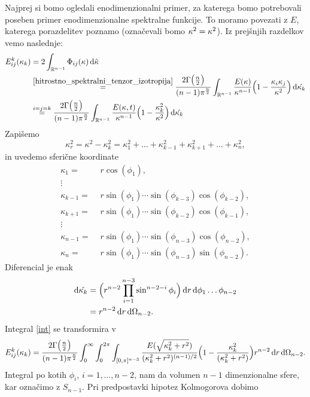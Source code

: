 \documentclass[mat2, tisk]{fmfdelo}
\newcommand{\R}{\mathbb R}
\newcommand{\bd}{\textbf}
\begin{document}
Najprej si bomo ogledali enodimenzionalni primer, za katerega bomo
potrebovali poseben primer enodimenzionalne spektralne funkcije. To moramo 
povezati z $E$, katerega porazdelitev poznamo (označevali bomo $\bd{\text{$\kappa$}}^2 = \kappa^2$). Iz prejšnjih razdelkov vemo 
naslednje: 
\begin{align}
E_{ij}^k(\kappa_k) &= 2 \int_{\R^{n-1}}\Phi_{ij}(\bd{\text{$\kappa$}}) \dif \hat{\bd{\text{$\kappa$}}} \nonumber\\
&\stackrel{\eqref{hitrostno_spektralni_tenzor_izotropija}}{=} \frac{2\Gamma\big(\frac{n}{2}\big)}{(n-1)\pi^\frac{n}{2}} \int_{\R^{n-1}} \frac{E(\kappa)}{\kappa^{n-1}}\Big(1 - \frac{\kappa_i \kappa_j}{\kappa^2}\Big)\dif \hat{\bd{\text{$\kappa_k$}}}\nonumber\\
&\stackrel{i=j=k}{=} \frac{2\Gamma\big(\frac{n}{2}\big)}{(n-1)\pi^\frac{n}{2}} \int_{\R^{n-1}} \frac{E(\kappa, t)}{\kappa^{n-1}}\Big(1 - \frac{\kappa_k^2}{\kappa^2}\Big)\dif \hat{\bd{\text{$\kappa_k$}}}
\label{int}
\end{align}
Zapišemo 
$$
\kappa_r^2 = \kappa^2 - \kappa_k^2 = \kappa_1^2 + \dots + \kappa_{k-1}^2 + \kappa_{k+1}^2 + \dots + \kappa_n^2,
$$
in uvedemo sferične koordinate 
\begin{align*}
\kappa_1 =& \,\,r\cos(\phi_1), \\
\vdots &\\
\kappa_{k-1} =& \,\,r\sin(\phi_{1}) \cdots \sin(\phi_{k-3}) \cos(\phi_{k-2}),\\
\kappa_{k+1} =& \,\,r\sin(\phi_{1}) \cdots \sin(\phi_{k-2}) \cos(\phi_{k-1}),\\
\vdots &\\
\kappa_{n-1} =& \,\,r\sin(\phi_{1}) \cdots \sin(\phi_{n-3}) \cos(\phi_{n-2}),\\
\kappa_{n} =& \,\,r\sin(\phi_{1}) \cdots \sin(\phi_{n-3}) \sin(\phi_{n-2}).
\end{align*}
Diferencial je enak 
\begin{align*}
\dif \hat{\bd{\text{$\kappa_k$}}} &= \Big(r^{n-2} \prod_{i=1}^{n-3} \sin^{n-2-i}{\phi_i}\Big) \dif r \dif \phi_1 \dots \phi_{n-2} \\
&= r^{n-2} \dif r \dif \Omega_{n-2}.
\end{align*}
Integral \eqref{int} se transformira v
\begin{align*}
E_{ij}^k(\kappa_k) = \frac{2\Gamma\big(\frac{n}{2}\big)}{(n-1)\pi^\frac{n}{2}} \int_{0}^\infty \int_{0}^{2\pi} \int_{[0,\pi]^{n-3}}\frac{E(\sqrt{\kappa_k^2 + r^2})}{(\kappa_k^2 + r^2)^{(n-1)/2}}\Big(1 - \frac{\kappa_k^2}{(\kappa_k^2 + r^2)}\Big) r^{n-2} \dif r \dif \Omega_{n-2}.\\
\end{align*}
Integral po kotih $\phi_i$, $i = 1, \dots, n-2$, nam da volumen $n-1$ dimenzionalne sfere, kar
označimo z $S_{n-1}$. Pri predpostavki hipotez Kolmogorova dobimo
\end{document}
